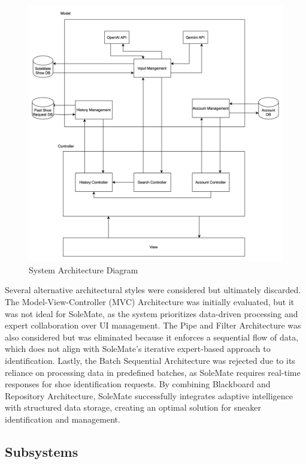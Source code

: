 \documentclass[]{article}
\begin{document}
\begin{figure}[H]
    \centering
    \includegraphics[width=\textwidth]{archdiagram.png}
    \caption{System Architecture Diagram}
\end{figure}

Several alternative architectural styles were considered but ultimately discarded. The Model-View-Controller (MVC) Architecture was initially evaluated, but it was not ideal for SoleMate, as the system prioritizes data-driven processing and expert collaboration over UI management. The Pipe and Filter Architecture was also considered but was eliminated because it enforces a sequential flow of data, which does not align with SoleMate’s iterative expert-based approach to identification. Lastly, the Batch Sequential Architecture was rejected due to its reliance on processing data in predefined batches, as SoleMate requires real-time responses for shoe identification requests. By combining Blackboard and Repository Architecture, SoleMate successfully integrates adaptive intelligence with structured data storage, creating an optimal solution for sneaker identification and management.

\subsection{Subsystems}
\label{sub:subsystems}
\end{document}

